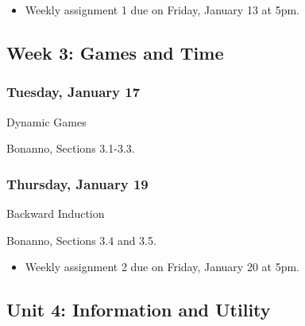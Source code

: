 \documentclass[
]{article}
\providecommand{\tightlist}{%
  \setlength{\itemsep}{0pt}\setlength{\parskip}{0pt}}
\begin{document}
\begin{itemize}
\tightlist
\item
  Weekly assignment 1 due on Friday, January 13 at 5pm.
\end{itemize}

\hypertarget{week-3-games-and-time}{%
\subsection{Week 3: Games and Time}\label{week-3-games-and-time}}

\begin{multicols}{2}

\hypertarget{tuesday-january-17}{%
\subsubsection{Tuesday, January 17}\label{tuesday-january-17}}

\begin{description}
\tightlist
\item[Topic]
Dynamic Games
\item[Reading]
Bonanno, Sections 3.1-3.3.
\end{description}

\hypertarget{thursday-january-19}{%
\subsubsection{Thursday, January 19}\label{thursday-january-19}}

\begin{description}
\tightlist
\item[Topic]
Backward Induction
\item[Reading]
Bonanno, Sections 3.4 and 3.5.
\end{description}

\end{multicols}

\begin{itemize}
\tightlist
\item
  Weekly assignment 2 due on Friday, January 20 at 5pm.
\end{itemize}

\newpage

\hypertarget{unit-4-information-and-utility}{%
\subsection{Unit 4: Information and
Utility}\label{unit-4-information-and-utility}}
\end{document}
